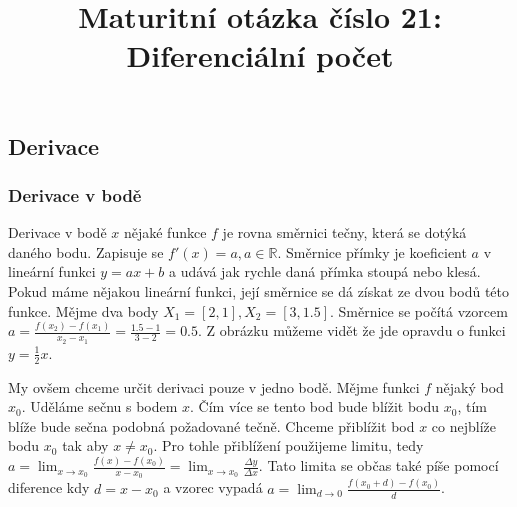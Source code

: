 \documentclass[12pt]{article}
\title{Maturitní otázka číslo 21: Diferenciální počet}
\author{}
\date{}
\begin{document}
\maketitle
\subsection*{Derivace}
\subsubsection*{Derivace v bodě}
Derivace v bodě $x$ nějaké funkce $f$ je rovna směrnici tečny, která se dotýká daného bodu. Zapisuje
se $f'(x) = a, a \in \mathbb{R}$. Směrnice přímky je koeficient $a$ v lineární funkci $y = ax + b$ a
udává jak rychle daná přímka stoupá nebo klesá. Pokud máme nějakou lineární funkci, její směrnice
se dá získat ze dvou bodů této funkce. Mějme dva body $X_1 = [2,1], X_2 = [3,1.5]$. Směrnice
se počítá vzorcem $a = \frac{f(x_2) - f(x_1)}{x_2 - x_1} = \frac{1.5 - 1}{3 - 2} = 0.5$. Z obrázku
můžeme vidět že jde opravdu o funkci $y = \frac{1}{2}x$.
\begin{center}
\end{center}
My ovšem chceme určit derivaci pouze v jedno bodě. Mějme funkci $f$ nějaký bod $x_0$. Uděláme
sečnu s bodem $x$. Čím více se tento bod bude blížit bodu $x_0$, tím blíže bude
sečna podobná požadované tečně. Chceme přiblížit bod $x$ co nejblíže bodu $x_0$ tak aby $x \ne x_0$.
Pro tohle přiblížení použijeme limitu, tedy $a = \lim_{x \to x_0} \frac{f(x) - f(x_0)}{x - x_0} =
\lim_{x \to x_0} \frac{\Delta y}{\Delta x}$. Tato limita se občas také píše pomocí diference kdy $d = x - x_0$ a vzorec
vypadá $a = \lim_{d \to 0} \frac{f(x_0 + d) - f(x_0)}{d}$.
\end{document}
